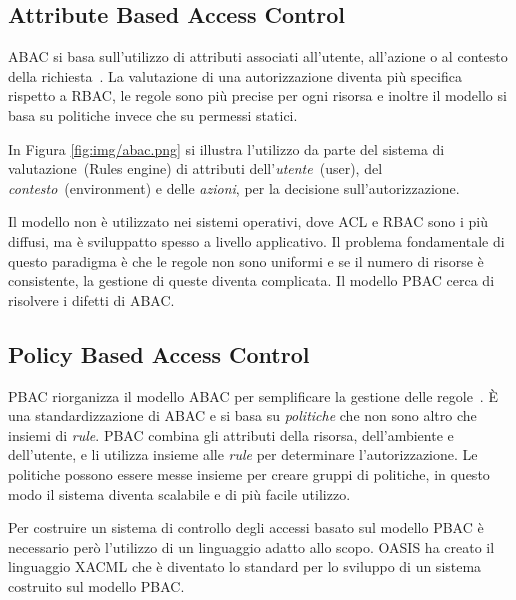 \subsection*{Attribute Based Access Control}
\label{sub:ABAC}
\ac{ABAC} si basa sull'utilizzo di attributi associati all'utente, all'azione o al contesto
della richiesta~\cite{ABAC}. La valutazione di una autorizzazione diventa più specifica rispetto a \ac{RBAC},
le regole sono più precise per ogni risorsa e inoltre il modello si basa su politiche invece che su permessi statici.

In Figura \ref{fig:img/abac.png} si illustra l'utilizzo da parte del sistema di valutazione~(Rules engine) di
attributi dell'\emph{utente}~(user), del \emph{contesto}~(environment) e delle \emph{azioni}, per la decisione
sull'autorizzazione.

Il modello non è utilizzato nei sistemi operativi, dove \ac{ACL} e \ac{RBAC} sono i più diffusi, ma è sviluppatto
spesso a livello applicativo. Il problema fondamentale di questo paradigma è che le regole non sono uniformi e se il numero
di risorse è consistente, la gestione di queste diventa complicata. Il modello \acf{PBAC} cerca di
risolvere i difetti di \ac{ABAC}.
\subsection*{Policy Based Access Control}
\label{sub:PBAC}
\ac{PBAC} riorganizza il modello \ac{ABAC} per semplificare la gestione delle regole~\cite{NISTACM}.
\MakeUppercase{è} una standardizzazione di \ac{ABAC} e si basa su \emph{politiche} che non sono altro che insiemi di \emph{rule}.
\ac{PBAC} combina gli attributi della risorsa, dell'ambiente e dell'utente, e li utilizza insieme alle \emph{rule} per
determinare l'autorizzazione.
Le politiche possono essere messe insieme per creare gruppi di politiche, in questo modo il sistema diventa scalabile e di
più facile utilizzo.\par
Per costruire un sistema di controllo degli accessi basato sul modello \ac{PBAC} è necessario però l'utilizzo di
un linguaggio adatto allo scopo. \ac{OASIS} ha creato il linguaggio \ac{XACML} che è diventato lo standard per lo sviluppo di un sistema costruito sul modello PBAC.

